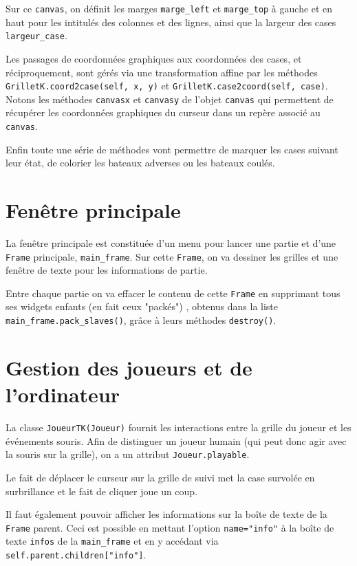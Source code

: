 Sur ce \texttt{canvas}, on définit les marges \texttt{marge\_left} et \texttt{marge\_top} à gauche et en haut pour les intitulés des colonnes et des lignes, ainsi que la largeur des cases \texttt{largeur\_case}. 

\medskip

Les passages de coordonnées graphiques aux coordonnées des cases, et réciproquement, sont gérés via  une transformation affine par les méthodes \texttt{GrilletK.coord2case(self, x, y)} et \texttt{GrilletK.case2coord(self, case)}. Notons les méthodes \texttt{canvasx} et \texttt{canvasy} de l'objet \texttt{canvas} qui permettent de récupérer les coordonnées graphiques du curseur dans un repère associé au \texttt{canvas}.

\medskip

Enfin toute une série de méthodes vont permettre de marquer les cases suivant leur état, de colorier les bateaux adverses ou les bateaux coulés.  

\section{Fenêtre principale}
La fenêtre principale est constituée d'un menu pour lancer une partie et d'une \texttt{Frame} principale, \texttt{main\_frame}. Sur cette \texttt{Frame}, on va dessiner les grilles et une fenêtre de texte pour les informations de partie.

\medskip

Entre chaque partie on va effacer le contenu de cette \texttt{Frame} en supprimant tous ses widgets enfants (en fait ceux "packés") , obtenus dans la liste \texttt{main\_frame.pack\_slaves()}, grâce à leurs méthodes \texttt{destroy()}. 

\section{Gestion des joueurs et de l'ordinateur}
La classe \texttt{JoueurTK(Joueur)} fournit les interactions entre la grille du joueur et les événements souris. Afin de distinguer un joueur humain (qui peut donc agir avec la souris sur la grille), on a un attribut \texttt{Joueur.playable}.

Le fait de déplacer le curseur sur la grille de suivi met la case survolée en surbrillance et le fait de cliquer joue un coup.

Il faut également pouvoir afficher les informations sur la boîte de texte de la \texttt{Frame} parent. Ceci est possible  en mettant l'option \texttt{name="info"} à la boîte de texte \texttt{infos} de la \texttt{main\_frame} et en y accédant via \texttt{self.parent.children["info"]}.

